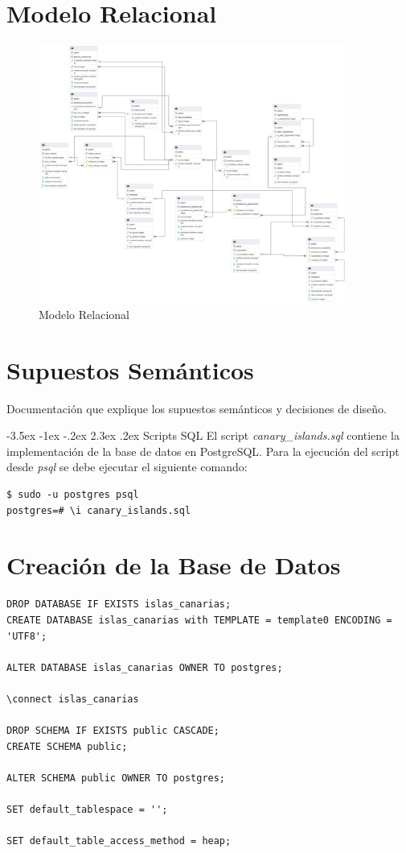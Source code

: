 \documentclass[11pt]{report}
\makeatletter
\renewcommand\chapter{\@startsection{chapter}{0}{\z@}%
    {-3.5ex \@plus -1ex \@minus -.2ex}%
    {2.3ex \@plus.2ex}%
    {\normalfont\Large\bfseries}}
\makeatother
\begin{document}
\section{Modelo Relacional}
\begin{figure}[H]
    \centering
    \includegraphics[width=0.9\textwidth]{../diagrams/RELACIONAL.jpg}
    \caption{Modelo Relacional}
    \label{fig:modelo_relacional}
\end{figure}

\section{Supuestos Semánticos}
Documentación que explique los supuestos semánticos y decisiones de diseño.

\chapter{Scripts SQL}
El script \emph{canary\_islands.sql} contiene la implementación de la base de datos en PostgreSQL. Para la ejecución
del script desde \emph{psql} se debe ejecutar el siguiente comando:
\begin{verbatim}
$ sudo -u postgres psql
postgres=# \i canary_islands.sql
\end{verbatim}

\section{Creación de la Base de Datos}
\begin{verbatim}
DROP DATABASE IF EXISTS islas_canarias;
CREATE DATABASE islas_canarias with TEMPLATE = template0 ENCODING = 'UTF8';

ALTER DATABASE islas_canarias OWNER TO postgres;

\connect islas_canarias

DROP SCHEMA IF EXISTS public CASCADE;
CREATE SCHEMA public;

ALTER SCHEMA public OWNER TO postgres;

SET default_tablespace = '';

SET default_table_access_method = heap;

\end{verbatim}
\end{document}
